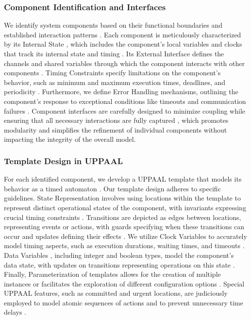 \subsubsection{Component Identification and Interfaces}
We identify system components based on their functional boundaries and established interaction patterns \cite{kopetz2022real,hoare1978communicating}. Each component is meticulously characterized by its  Internal State , which includes the component's local variables and clocks that track its internal state and timing \cite{alur1994theory}. Its  External Interface  defines the channels and shared variables through which the component interacts with other components \cite{hoare1978communicating,roscoe1998theory}.  Timing Constraints  specify limitations on the component's behavior, such as minimum and maximum execution times, deadlines, and periodicity \cite{kopetz2022real,buttazzo1997hard}. Furthermore, we define  Error Handling  mechanisms, outlining the component's response to exceptional conditions like timeouts and communication failures \cite{scherer2006synchronization,reghenzani2023software}. Component interfaces are carefully designed to minimize coupling while ensuring that all necessary interactions are fully captured \cite{broy2010seamless}, which promotes modularity and simplifies the refinement of individual components without impacting the integrity of the overall model.

\subsubsection{Template Design in UPPAAL}
For each identified component, we develop a  UPPAAL template  that models its behavior as a timed automaton \cite{larsen1997uppaal,bengtsson1996uppaal}. Our template design adheres to specific guidelines.  State Representation  involves using locations within the template to represent distinct operational states of the component, with invariants expressing crucial timing constraints \cite{alur1994theory,bengtsson2003timed}.  Transitions  are depicted as edges between locations, representing events or actions, with guards specifying when these transitions can occur and updates defining their effects \cite{larsen1997uppaal,david2015uppaal}. We utilize  Clock Variables  to accurately model timing aspects, such as execution durations, waiting times, and timeouts \cite{alur1994theory,alur1999timed}.  Data Variables , including integer and boolean types, model the component's data state, with updates on transitions representing operations on this state \cite{larsen1997uppaal,david2015uppaal}. Finally,  Parameterization  of templates allows for the creation of multiple instances or facilitates the exploration of different configuration options \cite{bengtsson1996uppaal,david2015uppaal}. Special UPPAAL features, such as committed and urgent locations, are judiciously employed to model atomic sequences of actions and to prevent unnecessary time delays \cite{larsen1997uppaal,david2015uppaal}.

